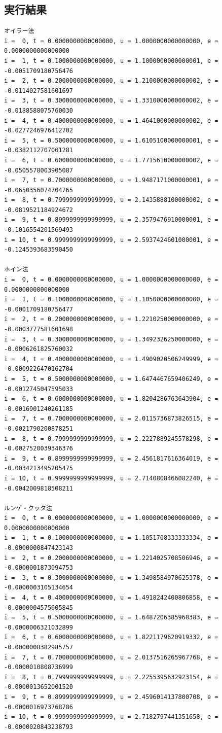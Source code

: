 \documentclass[a4j,titlepage]{jsarticle}
\begin{document}
\subsection{実行結果}
\begin{lstlisting}[style=text,caption=課題3--5の実行結果,label=lst:kekka3]
オイラー法
i =  0, t = 0.0000000000000000, u = 1.0000000000000000, e = 0.0000000000000000
i =  1, t = 0.1000000000000000, u = 1.1000000000000001, e = -0.0051709180756476
i =  2, t = 0.2000000000000000, u = 1.2100000000000002, e = -0.0114027581601697
i =  3, t = 0.3000000000000000, u = 1.3310000000000002, e = -0.0188588075760030
i =  4, t = 0.4000000000000000, u = 1.4641000000000002, e = -0.0277246976412702
i =  5, t = 0.5000000000000000, u = 1.6105100000000001, e = -0.0382112707001281
i =  6, t = 0.6000000000000000, u = 1.7715610000000002, e = -0.0505578003905087
i =  7, t = 0.7000000000000000, u = 1.9487171000000001, e = -0.0650356074704765
i =  8, t = 0.7999999999999999, u = 2.1435888100000002, e = -0.0819521184924672
i =  9, t = 0.8999999999999999, u = 2.3579476910000001, e = -0.1016554201569493
i = 10, t = 0.9999999999999999, u = 2.5937424601000001, e = -0.1245393683590450

ホイン法
i =  0, t = 0.0000000000000000, u = 1.0000000000000000, e = 0.0000000000000000
i =  1, t = 0.1000000000000000, u = 1.1050000000000000, e = -0.0001709180756477
i =  2, t = 0.2000000000000000, u = 1.2210250000000000, e = -0.0003777581601698
i =  3, t = 0.3000000000000000, u = 1.3492326250000000, e = -0.0006261825760032
i =  4, t = 0.4000000000000000, u = 1.4909020506249999, e = -0.0009226470162704
i =  5, t = 0.5000000000000000, u = 1.6474467659406249, e = -0.0012745047595033
i =  6, t = 0.6000000000000000, u = 1.8204286763643904, e = -0.0016901240261185
i =  7, t = 0.7000000000000000, u = 2.0115736873826515, e = -0.0021790200878251
i =  8, t = 0.7999999999999999, u = 2.2227889245578298, e = -0.0027520039346376
i =  9, t = 0.8999999999999999, u = 2.4561817616364019, e = -0.0034213495205475
i = 10, t = 0.9999999999999999, u = 2.7140808466082240, e = -0.0042009818508211

ルンゲ・クッタ法
i =  0, t = 0.0000000000000000, u = 1.0000000000000000, e = 0.0000000000000000
i =  1, t = 0.1000000000000000, u = 1.1051708333333334, e = -0.0000000847423143
i =  2, t = 0.2000000000000000, u = 1.2214025708506946, e = -0.0000001873094753
i =  3, t = 0.3000000000000000, u = 1.3498584970625378, e = -0.0000003105134654
i =  4, t = 0.4000000000000000, u = 1.4918242400806858, e = -0.0000004575605845
i =  5, t = 0.5000000000000000, u = 1.6487206385968383, e = -0.0000006321032899
i =  6, t = 0.6000000000000000, u = 1.8221179620919332, e = -0.0000008382985757
i =  7, t = 0.7000000000000000, u = 2.0137516265967768, e = -0.0000010808736999
i =  8, t = 0.7999999999999999, u = 2.2255395632923154, e = -0.0000013652001520
i =  9, t = 0.8999999999999999, u = 2.4596014137800708, e = -0.0000016973768786
i = 10, t = 0.9999999999999999, u = 2.7182797441351658, e = -0.0000020843238793
\end{lstlisting}
\end{document}
